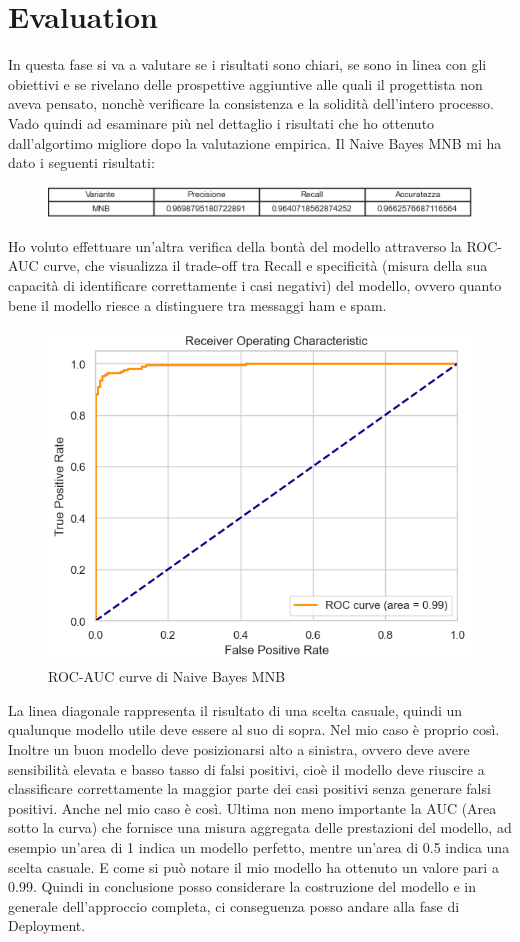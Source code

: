 \documentclass[]{article}
\begin{document}
        \section{Evaluation}
            In questa fase si va a valutare se i
            risultati sono chiari, se sono in linea con gli obiettivi e se rivelano delle prospettive aggiuntive
            alle quali il progettista non aveva pensato, nonchè verificare la consistenza e la solidità dell’intero processo.
            Vado quindi ad esaminare più nel dettaglio i risultati che ho ottenuto dall'algortimo migliore dopo la valutazione empirica.
            Il Naive Bayes MNB mi ha dato i seguenti risultati:
            \begin{figure}[H]
                \centering
                \includegraphics[width=1\linewidth]{images/MNBresult.png}
                \label{fig:enter-label}
            \end{figure}
             Ho voluto effettuare un'altra verifica della bontà del modello attraverso la ROC-AUC curve, che visualizza il trade-off tra Recall e specificità (misura della sua capacità di identificare correttamente i casi negativi) del modello, ovvero quanto bene il modello riesce a distinguere tra messaggi ham e spam.
             \begin{figure}[H]
                 \centering
                 \includegraphics[width=0.5\linewidth]{images/ROC-AUC.png}
                 \caption{ROC-AUC curve di Naive Bayes MNB}
                 \label{fig:enter-label}
             \end{figure}
             La linea diagonale rappresenta il risultato di una scelta casuale, quindi un qualunque modello utile deve essere al suo di sopra. Nel mio caso è proprio così. Inoltre un buon modello deve posizionarsi alto a sinistra, ovvero deve avere sensibilità elevata e basso tasso di falsi positivi, cioè il modello deve riuscire a classificare correttamente la maggior parte dei casi positivi senza generare falsi positivi. Anche nel mio caso è così. Ultima non meno importante la AUC (Area sotto la curva) che fornisce una misura aggregata delle prestazioni del modello, ad esempio un'area di 1 indica un modello perfetto, mentre un'area di 0.5 indica una scelta casuale. E come si può notare il mio modello ha ottenuto un valore pari a 0.99.
             Quindi in conclusione posso considerare la costruzione del modello e in generale dell'approccio completa, ci conseguenza posso andare alla fase di Deployment.
\end{document}
